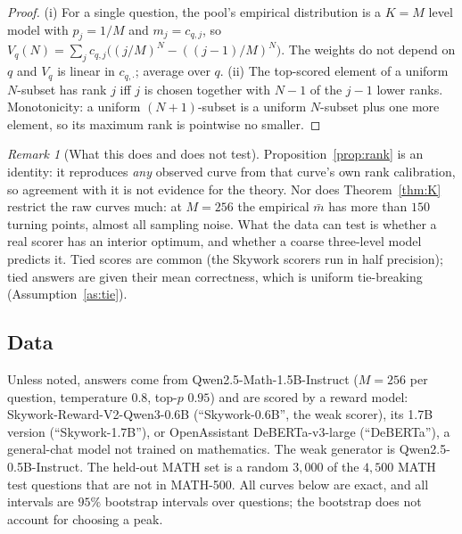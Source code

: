 \documentclass[11pt]{article}
\theoremstyle{definition}
\theoremstyle{remark}
\newtheorem{remark}{Remark}
\begin{document}
\begin{proof}
(i) For a single question, the pool's empirical distribution is a $K=M$ level model with
$p_j=1/M$ and $m_j=c_{q,j}$, so $V_q(N)=\sum_j c_{q,j}\bigl((j/M)^N-((j-1)/M)^N\bigr)$. The
weights do not depend on $q$ and $V_q$ is linear in $c_{q,\cdot}$; average over $q$.
(ii) The top-scored element of a uniform $N$-subset has rank $j$ iff $j$ is chosen together
with $N-1$ of the $j-1$ lower ranks. Monotonicity: a uniform $(N+1)$-subset is a uniform
$N$-subset plus one more element, so its maximum rank is pointwise no smaller.
\end{proof}

\begin{remark}[What this does and does not test]\label{rem:identity}
Proposition~\ref{prop:rank} is an identity: it reproduces \emph{any} observed curve from that
curve's own rank calibration, so agreement with it is not evidence for the theory. Nor does
Theorem~\ref{thm:K} restrict the raw curves much: at $M=256$ the empirical $\bar m$ has more than
$150$ turning points, almost all sampling noise. What the data can test is whether a real
scorer has an interior optimum, and whether a coarse three-level model predicts it.
Tied scores are common (the Skywork scorers run in half precision); tied answers are given their
mean correctness, which is uniform tie-breaking (Assumption~\ref{as:tie}).
\end{remark}

\subsection{Data}

Unless noted, answers come from Qwen2.5-Math-1.5B-Instruct ($M=256$ per question, temperature $0.8$, top-$p$
$0.95$) and are scored by a reward model: Skywork-Reward-V2-Qwen3-0.6B (``Skywork-0.6B'', the weak
scorer), its 1.7B version (``Skywork-1.7B''), or OpenAssistant DeBERTa-v3-large (``DeBERTa''), a general-chat model not
trained on mathematics. The weak generator is Qwen2.5-0.5B-Instruct. The held-out MATH set is a random $3{,}000$ of the
$4{,}500$ MATH test questions that are not in MATH-500. All curves below are exact, and all intervals are $95\%$
bootstrap intervals over questions; the bootstrap does not account for choosing a peak.
\end{document}
